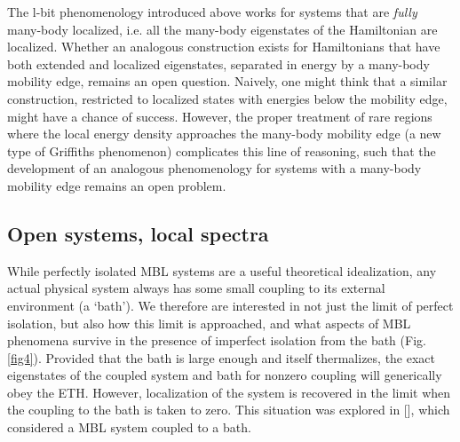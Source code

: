 \documentclass[amsmath,onecolumn, superscriptaddress,preprint,aps]{revtex4}
\renewcommand{\cite}[1]{[\onlinecite{#1}]}
\begin{document}
    The l-bit phenomenology introduced above works for systems that are {\it fully} many-body localized, i.e. all the many-body eigenstates of the Hamiltonian are localized.  Whether an analogous construction exists for Hamiltonians that have both extended and localized eigenstates, separated in energy by a many-body mobility edge, remains an open question.  Naively, one might think that a similar construction, restricted to localized states with energies below the mobility edge, might have a chance of success.  However, the proper treatment of rare regions where the local energy density approaches the many-body mobility edge (a new type of Griffiths phenomenon) complicates this line of reasoning, such that the development of an analogous phenomenology for systems with a many-body mobility edge remains an open problem.

\subsection{Open systems, local spectra}
\label{open systems}
While perfectly isolated MBL systems are a useful theoretical idealization,
any actual physical system always has some small coupling to its external environment (a `bath').
 We therefore are interested in not just the limit of perfect isolation, but also how this limit is approached, and what aspects of
 MBL phenomena survive in the presence of imperfect isolation from the bath (Fig. \ref{fig4}).  Provided that the bath is large enough and
 itself thermalizes, the exact eigenstates of the coupled system and bath for nonzero coupling will generically obey the ETH.
 However, localization of the system is recovered in the limit when the coupling to the bath is taken to zero.  This situation was explored
 in \cite{spectral}, which considered a MBL system coupled to a bath.
\end{document}
